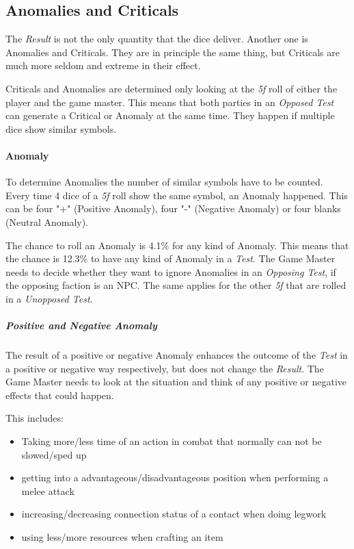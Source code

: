 \subsection{Anomalies and Criticals}

The \emph{Result} is not the only quantity that the dice deliver. Another one is
Anomalies and Criticals. They are in principle the same thing, but Criticals are
much more seldom and extreme in their effect.

Criticals and Anomalies are determined only looking at the \emph{5f} roll of either
the player and the game master. This means that both parties in an \emph{Opposed Test}
can generate a Critical or Anomaly at the same time. They happen if multiple dice
show similar symbols.

\paragraph{Anomaly}
To determine Anomalies the number of similar symbols have to be counted. Every time
4 dice of a \emph{5f} roll show the same symbol, an Anomaly happened.
This can be four "+" (Positive Anomaly), four "-" (Negative Anomaly) or four
blanks (Neutral Anomaly).

The chance to roll an Anomaly is 4.1\% for any kind of Anomaly. This means that the
chance is 12.3\% to have any kind of Anomaly in a \emph{Test}. The Game Master
needs to decide whether they want to ignore Anomalies in an \emph{Opposing Test}, if
the opposing faction is an NPC. The same applies for the other \emph{5f} that are
rolled in a \emph{Unopposed Test}.

\subparagraph{Positive and Negative Anomaly}
The result of a positive or negative Anomaly enhances the outcome of the
\emph{Test} in a positive or negative way respectively, but does not change the
\emph{Result}. The Game Master needs to look at the situation and think of any
positive or negative effects that could happen.

This includes:
\begin{itemize}[parsep=0em]
    \item Taking more/less time of an action in combat that normally can not
          be slowed/sped up
    \item getting into a advantageous/disadvantageous position when performing a
          melee attack
    \item increasing/decreasing connection status of a contact when doing legwork
    \item using less/more resources when crafting an item
\end{itemize}

